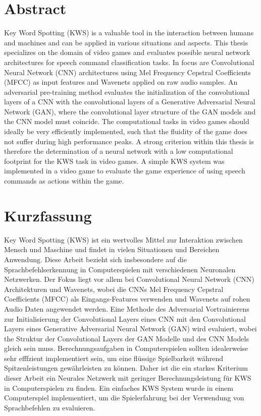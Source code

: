 
\chapter*{Abstract}\label{sec:shards_abstract}
Key Word Spotting (KWS) is a valuable tool in the interaction between humans and machines and can be applied in various situations and aspects.
This thesis specializes on the domain of video games and evaluates possible neural network architectures for speech command classification tasks.
In focus are Convolutional Neural Network (CNN) architectures using Mel Frequency Cepstral Coefficients (MFCC) as input features and Wavenets applied on raw audio samples.
An adversarial pre-training method evaluates the initialization of the convolutional layers of a CNN with the convolutional layers of a Generative Adversarial Neural Network (GAN), where the convolutional layer structure of the GAN models and the CNN model must coincide.
The computational tasks in video games should ideally be very efficiently implemented, such that the fluidity of the game does not suffer during high performance peaks.
A strong criterion within this thesis is therefore the determination of a neural network with a low computational footprint for the KWS task in video games.
A simple KWS system was implemented in a video game to evaluate the game experience of using speech commands as actions within the game.



\chapter*{Kurzfassung}
Key Word Spotting (KWS) ist ein wertvolles Mittel zur Interaktion zwischen Mensch und Maschine und findet in vielen Situationen und Bereichen Anwendung.
Diese Arbeit bezieht sich insbesondere auf die Sprachbefehlserkennung in Computerspielen mit verschiedenen Neuronalen Netzwerken.
Der Fokus liegt vor allem bei Convolutional Neural Network (CNN) Architekturen und Wavenets, wobei die CNNs Mel Frequency Cepstral Coefficients (MFCC) als Eingangs-Features verwenden und Wavenets auf rohen Audio Daten angewendet werden.
Eine Methode des Adversarial Vortrainierens zur Initialisierung der Convolutional Layers eines CNN mit den Convolutional Layers eines Generative Adversarial Neural Network (GAN) wird evaluiert, wobei the Struktur der Convolutional Layers der GAN Modelle und des CNN Models gleich sein muss.
Berechnungsaufgaben in Computerspielen sollten idealerweise sehr efffzient implementiert sein, um eine flüssige Spielbarkeit während Spitzenleistungen gewährleisten zu können.
Daher ist die ein starkes Kriterium dieser Arbeit ein Neurales Netzwerk mit geringer Berechnungsleistung für KWS in Computerspielen zu finden.
Ein einfaches KWS System wurde in einem Computerspiel implementiert, um die Spielerfahrung bei der Verwendung von Sprachbefehlen zu evaluieren.